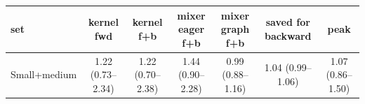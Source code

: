 \begin{tabular}{l c c c c c c }
\toprule
set & kernel fwd & kernel f+b & mixer eager f+b & mixer graph f+b & saved for backward & peak \\
\midrule
Small+medium & 1.22 (0.73--2.34) & 1.22 (0.70--2.38) & 1.44 (0.90--2.28) & 0.99 (0.88--1.16) & 1.04 (0.99--1.06) & 1.07 (0.86--1.50) \\
\bottomrule
\end{tabular}
